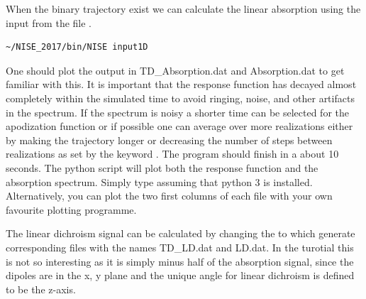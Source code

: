 When the binary trajectory exist we can calculate the linear absorption using the
input from the file .
\begin{lstlisting}[style=mystyle]
~/NISE_2017/bin/NISE input1D
\end{lstlisting}
One should plot the output in TD\_Absorption.dat and Absorption.dat to get familiar
with this. It is important that the response function has decayed almost completely
within the simulated time to avoid ringing, noise, and other artifacts in the spectrum. 
If the spectrum is noisy a shorter time can be selected for the apodization function
or if possible one can average over more realizations either by making the trajectory
longer or decreasing the number of steps between realizations as set by the keyword
. The program should finish in a 
about 10 seconds. The python script  will plot both the response function
and the absorption spectrum. Simply type  assuming that python 3
is installed. Alternatively, you can plot the two first columns of each file with your
own favourite plotting programme.

The linear dichroism signal can be calculated by changing the  to
 which generate corresponding files with the names TD\_LD.dat and LD.dat.
In the turotial this is not so interesting as it is simply minus half of the absorption
signal, since the dipoles are in the x, y plane and the unique angle for linear
dichroism is defined to be the z-axis.

